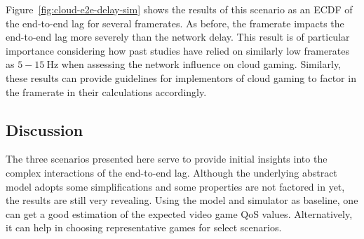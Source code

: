 Figure~\ref{fig:cloud-e2e-delay-sim} shows the results of this scenario 
as an \gls{ECDF} of the end-to-end lag for several framerates. As before, 
the framerate impacts the end-to-end lag more severely than the network delay.
This result is of particular importance considering how past studies 
have relied on similarly low framerates as $5-\SI{15}{\hertz}$ when 
assessing the network influence on cloud gaming.
Similarly, these results can provide guidelines for implementors of 
cloud gaming to factor in the framerate in their calculations accordingly.


\subsection{Discussion}

The three scenarios presented here serve to provide initial insights into the complex interactions of the end-to-end lag. Although the underlying abstract model adopts some simplifications and some properties are not factored in yet, the results are still very revealing.
Using the model and simulator as baseline, one can get a good estimation of the expected video game \gls{QoS} values. Alternatively, it can help in choosing representative games for select scenarios.








